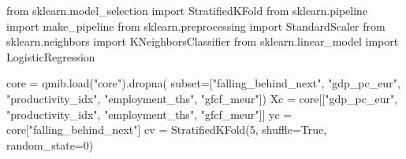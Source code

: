 \documentclass[
  letterpaper,
  10pt,
  twoside,
  openright,
  numbers=noenddot,
  chapterprefix=true]{scrbook}
\newenvironment{Shaded}{}{}
\newcommand{\DecValTok}[1]{\textcolor[rgb]{0.00,0.36,0.77}{#1}}
\newcommand{\ImportTok}[1]{\textcolor[rgb]{0.01,0.18,0.38}{#1}}
\newcommand{\NormalTok}[1]{\textcolor[rgb]{0.14,0.16,0.18}{#1}}
\newcommand{\OperatorTok}[1]{\textcolor[rgb]{0.14,0.16,0.18}{#1}}
\newcommand{\StringTok}[1]{\textcolor[rgb]{0.01,0.18,0.38}{#1}}
\newcommand{\VariableTok}[1]{\textcolor[rgb]{0.89,0.38,0.04}{#1}}
\begin{document}
\label{check-real}
\begin{Shaded}
\begin{Highlighting}[]
\ImportTok{from}\NormalTok{ sklearn.model\_selection }\ImportTok{import}\NormalTok{ StratifiedKFold}
\ImportTok{from}\NormalTok{ sklearn.pipeline }\ImportTok{import}\NormalTok{ make\_pipeline}
\ImportTok{from}\NormalTok{ sklearn.preprocessing }\ImportTok{import}\NormalTok{ StandardScaler}
\ImportTok{from}\NormalTok{ sklearn.neighbors }\ImportTok{import}\NormalTok{ KNeighborsClassifier}
\ImportTok{from}\NormalTok{ sklearn.linear\_model }\ImportTok{import}\NormalTok{ LogisticRegression}

\NormalTok{core }\OperatorTok{=}\NormalTok{ qmib.load(}\StringTok{"core"}\NormalTok{).dropna(}
\NormalTok{    subset}\OperatorTok{=}\NormalTok{[}\StringTok{"falling\_behind\_next"}\NormalTok{, }\StringTok{"gdp\_pc\_eur"}\NormalTok{, }\StringTok{"productivity\_idx"}\NormalTok{,}
            \StringTok{"employment\_ths"}\NormalTok{, }\StringTok{"gfcf\_meur"}\NormalTok{])}
\NormalTok{Xc }\OperatorTok{=}\NormalTok{ core[[}\StringTok{"gdp\_pc\_eur"}\NormalTok{, }\StringTok{"productivity\_idx"}\NormalTok{, }\StringTok{"employment\_ths"}\NormalTok{, }\StringTok{"gfcf\_meur"}\NormalTok{]]}
\NormalTok{yc }\OperatorTok{=}\NormalTok{ core[}\StringTok{"falling\_behind\_next"}\NormalTok{]}
\NormalTok{cv }\OperatorTok{=}\NormalTok{ StratifiedKFold(}\DecValTok{5}\NormalTok{, shuffle}\OperatorTok{=}\VariableTok{True}\NormalTok{, random\_state}\OperatorTok{=}\DecValTok{0}\NormalTok{)}


\end{Highlighting}
\end{Shaded}
\end{document}
